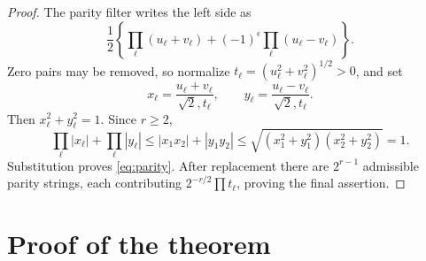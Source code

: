 \documentclass[11pt]{article}
\begin{document}
\begin{proof}
The parity filter writes the left side as
\[
 \frac12\left\{\prod_\ell(u_\ell+v_\ell)
 +(-1)^\epsilon\prod_\ell(u_\ell-v_\ell)\right\}.
\]
Zero pairs may be removed, so normalize
$t_\ell=(u_\ell^2+v_\ell^2)^{1/2}>0$, and set
\[
 x_\ell=\frac{u_\ell+v_\ell}{\sqrt2,t_\ell},\qquad
 y_\ell=\frac{u_\ell-v_\ell}{\sqrt2,t_\ell}.
\]
Then $x_\ell^2+y_\ell^2=1$.  Since $r\geq2$,
\[
 \prod_\ell|x_\ell|+\prod_\ell|y_\ell|
 \leq |x_1x_2|+|y_1y_2|
 \leq\sqrt{(x_1^2+y_1^2)(x_2^2+y_2^2)}=1.
\]
Substitution proves \eqref{eq:parity}.  After replacement there are
$2^{r-1}$ admissible parity strings, each contributing
$2^{-r/2}\prod t_\ell$, proving the final assertion.
\end{proof}

\section{Proof of the theorem}
\end{document}
